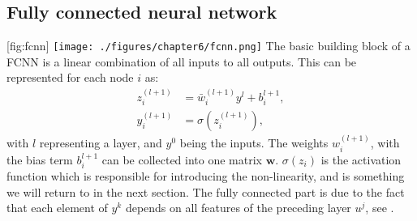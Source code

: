 \subsection{Fully connected neural network}
[fig:fcnn]
{\texttt{[image: ./figures/chapter6/fcnn.png]}}
The basic building block of a \acf{FCNN} is a linear combination of all inputs to all outputs.
This can be represented for each node $i$ as:
\begin{align}
	z_i^{(l+1)} &= \bar{w}_i^{(l+1)}y^l + b_i^{l+1},\\
	y_i^{(l+1)} &= \sigma(z_i^{(l+1)}),
\end{align}
with $l$ representing a layer, and $y^0$ being the inputs. The weights $w_i^{(l+1)}$, with the bias term $b_i^{l+1}$ can be collected into one matrix $\textbf{w}$.
$\sigma(z_i)$ is the activation function which is responsible for introducing the non-linearity, and is something we will return to in the next section. 
The fully connected part is due to the fact that each element of $y^k$ depends on all features of the preceding layer $u^j$, see .
